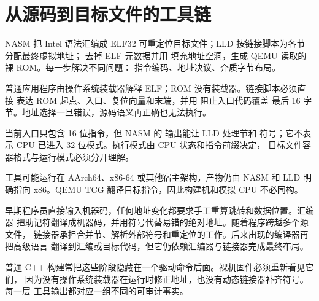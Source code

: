 \section{从源码到目标文件的工具链}

NASM 把 Intel 语法汇编成 ELF32 可重定位目标文件；LLD 按链接脚本为各节
分配最终虚拟地址； 去掉 ELF 元数据并用
 填充地址空洞，生成 QEMU 读取的裸 ROM。每一步解决不同问题：
指令编码、地址决议、介质字节布局。

\begin{center}
\end{center}

普通应用程序由操作系统装载器解释 ELF；ROM 没有装载器。链接脚本必须直接
表达 ROM 起点、入口、复位向量和末端，并用  阻止入口代码覆盖
最后 16 字节。地址选择一旦错误，源码语义再正确也无法执行。

当前入口只包含 16 位指令，但 NASM 的  输出能让 LLD 处理节和
符号；它不表示 CPU 已进入 32 位模式。执行模式由 CPU 状态和指令前缀决定，
目标文件容器格式与运行模式必须分开理解。

工具可能运行在 AArch64、x86-64 或其他宿主架构，产物仍由 NASM 和 LLD
明确指向 x86。QEMU TCG 翻译目标指令，因此构建机和模拟 CPU 不必同构。

早期程序员直接输入机器码，任何地址变化都要求手工重算跳转和数据位置。汇编器
把助记符翻译成机器码，并用符号代替易错的绝对地址。随着程序跨越多个源文件，
链接器承担合并节、解析外部符号和重定位的工作。后来出现的编译器再把高级语言
翻译到汇编或目标代码，但它仍依赖汇编器与链接器完成最终布局。

普通 C++ 构建常把这些阶段隐藏在一个驱动命令后面。裸机固件必须重新看见它们，
因为没有操作系统装载器在运行时修正地址，也没有动态链接器补齐符号。每一层
工具输出都对应一组不同的可审计事实。

